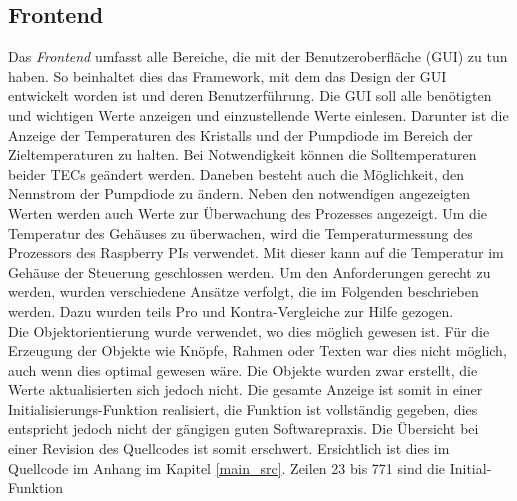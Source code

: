 \subsection{Frontend}
Das \textit{Frontend} umfasst alle Bereiche, die mit der Benutzeroberfläche (GUI) zu tun haben. So beinhaltet dies das Framework, mit dem das Design der GUI entwickelt worden ist und deren Benutzerführung. 
Die GUI soll alle benötigten und wichtigen Werte anzeigen und einzustellende Werte einlesen. Darunter ist die Anzeige der Temperaturen des Kristalls und der Pumpdiode im Bereich der Zieltemperaturen zu halten. Bei Notwendigkeit können die Solltemperaturen beider TECs geändert werden. Daneben besteht auch die Möglichkeit, den Nennstrom der Pumpdiode zu ändern. Neben den notwendigen angezeigten Werten werden auch Werte zur Überwachung des Prozesses angezeigt. Um die Temperatur des Gehäuses zu überwachen, wird die Temperaturmessung des Prozessors des Raspberry PIs verwendet. Mit dieser kann auf die Temperatur im Gehäuse der Steuerung geschlossen werden. Um den Anforderungen gerecht zu werden, wurden verschiedene Ansätze verfolgt, die im Folgenden beschrieben werden. Dazu wurden teils Pro und Kontra-Vergleiche zur Hilfe gezogen.\\

Die Objektorientierung wurde verwendet, wo dies möglich gewesen ist. Für die Erzeugung der Objekte wie Knöpfe, Rahmen oder Texten war dies nicht möglich, auch wenn dies optimal gewesen wäre. Die Objekte wurden zwar erstellt, die Werte aktualisierten sich jedoch nicht. Die gesamte Anzeige ist somit in einer Initialisierungs-Funktion realisiert, die Funktion ist vollständig gegeben, dies entspricht jedoch nicht der gängigen guten Softwarepraxis. Die Übersicht bei einer Revision des Quellcodes ist somit erschwert. Ersichtlich ist dies im Quellcode im Anhang im Kapitel \ref{main_src}. Zeilen 23 bis 771 sind die Initial-Funktion

